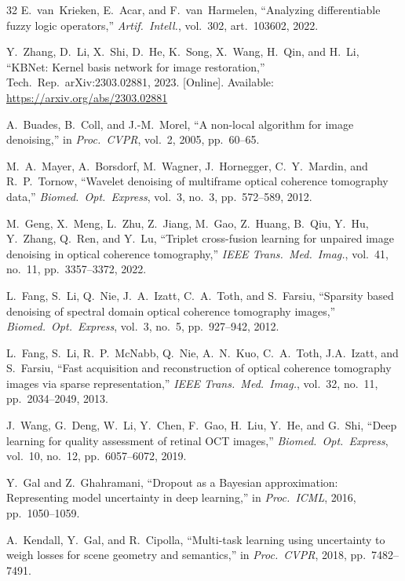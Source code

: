 \documentclass[journal,twoside,web]{ieeecolor}
\begin{document}
{\begin{thebibliography}{32}
E.~van~Krieken, E.~Acar, and F.~van~Harmelen, ``Analyzing differentiable fuzzy logic operators,'' \emph{Artif.\ Intell.}, vol.~302, art.~103602, 2022.

Y.~Zhang, D.~Li, X.~Shi, D.~He, K.~Song, X.~Wang, H.~Qin, and H.~Li, ``KBNet: Kernel basis network for image restoration,'' Tech.\ Rep.\ arXiv:2303.02881, 2023. [Online]. Available: \url{https://arxiv.org/abs/2303.02881}

A.~Buades, B.~Coll, and J.-M.~Morel, ``A non-local algorithm for image denoising,'' in \emph{Proc.\ CVPR}, vol.~2, 2005, pp.~60--65.

M.~A.~Mayer, A.~Borsdorf, M.~Wagner, J.~Hornegger, C.~Y.~Mardin, and R.~P.~Tornow, ``Wavelet denoising of multiframe optical coherence tomography data,'' \emph{Biomed.\ Opt.\ Express}, vol.~3, no.~3, pp.~572--589, 2012.

M.~Geng, X.~Meng, L.~Zhu, Z.~Jiang, M.~Gao, Z.~Huang, B.~Qiu, Y.~Hu, Y.~Zhang, Q.~Ren, and Y.~Lu, ``Triplet cross-fusion learning for unpaired image denoising in optical coherence tomography,'' \emph{IEEE Trans.\ Med.\ Imag.}, vol.~41, no.~11, pp.~3357--3372, 2022.

L.~Fang, S.~Li, Q.~Nie, J.~A.~Izatt, C.~A.~Toth, and S.~Farsiu, ``Sparsity based denoising of spectral domain optical coherence tomography images,'' \emph{Biomed.\ Opt.\ Express}, vol.~3, no.~5, pp.~927--942, 2012.

L.~Fang, S.~Li, R.~P.~McNabb, Q.~Nie, A.~N.~Kuo, C.~A.~Toth, J.A.~Izatt, and S.~Farsiu, ``Fast acquisition and reconstruction of optical coherence tomography images via sparse representation,'' \emph{IEEE Trans.\ Med.\ Imag.}, vol.~32, no.~11, pp.~2034--2049, 2013.

J.~Wang, G.~Deng, W.~Li, Y.~Chen, F.~Gao, H.~Liu, Y.~He, and G.~Shi, ``Deep learning for quality assessment of retinal OCT images,'' \emph{Biomed.\ Opt.\ Express}, vol.~10, no.~12, pp.~6057--6072, 2019.

Y.~Gal and Z.~Ghahramani, ``Dropout as a Bayesian approximation: Representing model uncertainty in deep learning,'' in \emph{Proc.\ ICML}, 2016, pp.~1050--1059.

A.~Kendall, Y.~Gal, and R.~Cipolla, ``Multi-task learning using uncertainty to weigh losses for scene geometry and semantics,'' in \emph{Proc.\ CVPR}, 2018, pp.~7482--7491.


\end{thebibliography}}
\end{document}
